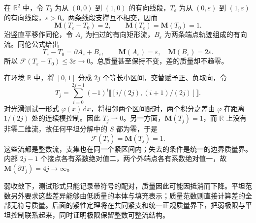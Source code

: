 \begin{example}\label{g3:exm:translated-segment-flat}
	在 \(\mathbb R^2\) 中，令 \(T_0\) 为从 \((0,0)\) 到 \((1,0)\) 的有向线段，\(T_\varepsilon\) 为从 \((0,\varepsilon)\) 到 \((1,\varepsilon)\) 的有向线段，\(\varepsilon>0\)。两条线段支撑互不相交，因而
	\[
		\mathbf M(T_\varepsilon-T_0)=2,
		\qquad \mathbf M(T_\varepsilon)=\mathbf M(T_0)=1.
	\]
	沿竖直平移作同伦，令 \(A_\varepsilon\) 为扫过的有向矩形流，\(B_\varepsilon\) 为两条端点轨迹组成的有向流。同伦公式给出
	\[
		T_\varepsilon-T_0=\partial A_\varepsilon+B_\varepsilon,
		\qquad \mathbf M(A_\varepsilon)=\varepsilon,
		\quad \mathbf M(B_\varepsilon)=2\varepsilon.
	\]
	所以 \(\mathcal F(T_\varepsilon-T_0)\le3\varepsilon\to0\)。总质量甚至保持不变，差的质量却不趋零。
\end{example}

\begin{example}\label{g3:exm:weak-not-flat-alternating-current}
	在环境 \(\mathbb R\) 中，将 \([0,1]\) 分成 \(2j\) 个等长小区间，交替赋予正、负取向，令
	\[
		T_j=\sum_{i=0}^{2j-1}(-1)^i
		\lBrack[i/(2j),(i+1)/(2j)]\rBrack.
	\]
	对光滑测试一形式 \(\varphi(x)\,\mathrm dx\)，将相邻两个区间配对，两个积分之差由 \(\varphi\) 在距离 \(1/(2j)\) 处的连续模控制。因此 \(T_j\rightharpoonup0\)。另一方面，\(\mathbf M(T_j)=1\)，而 \(\mathbb R\) 上没有非零二维流，故任何平坦分解中的 \(S\) 都为零，于是
	\[
		\mathcal F(T_j)=\mathbf M(T_j)=1.
	\]
	这些流都是整数流，支集也在同一个紧区间内；失去的条件是统一的边界质量界。内部 \(2j-1\) 个接点各有系数绝对值二，两个外端点各有系数绝对值一，故 \(\mathbf M(\partial T_j)=4j\to\infty\)。
\end{example}

弱收敛下，测试形式只能记录带符号的配对，质量因此可能因抵消而下降。平坦范数另外要求这些差异能够由低质量的本体与填充表示；质量范数则直接计算差的全部无符号质量。后面的紧性定理将在共同紧支和统一正规质量界下，把弱极限与平坦控制联系起来，同时证明极限保留整数可整流结构。
